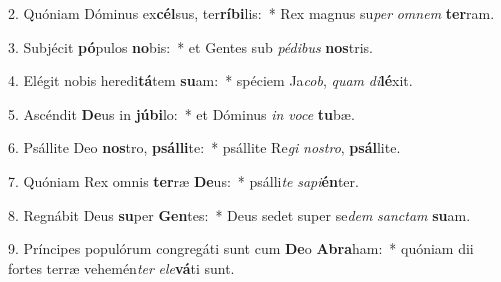 2. Quóniam Dóminus ex\textbf{cél}sus, ter\textbf{rí}\textbf{bi}lis:~*  Rex magnus su\textit{per} \textit{om}\textit{nem} \textbf{ter}ram.\

3. Subjécit \textbf{pó}pulos \textbf{no}bis:~*  et Gentes sub \textit{pé}\textit{di}\textit{bus} \textbf{nos}tris.\

4. Elégit nobis heredi\textbf{tá}tem \textbf{su}am:~*  spéciem Ja\textit{cob}, \textit{quam} \textit{di}\textbf{lé}xit.\

5. Ascéndit \textbf{De}us in \textbf{jú}\textbf{bi}lo:~*  et Dóminus \textit{in} \textit{vo}\textit{ce} \textbf{tu}bæ.\

6. Psállite Deo \textbf{nos}tro, \textbf{psál}\textbf{li}te:~*  psállite Re\textit{gi} \textit{nos}\textit{tro}, \textbf{psál}lite.\

7. Quóniam Rex omnis \textbf{ter}ræ \textbf{De}us:~*  psálli\textit{te} \textit{sa}\textit{pi}\textbf{én}ter.\

8. Regnábit Deus \textbf{su}per \textbf{Gen}tes:~*  Deus sedet super se\textit{dem} \textit{sanc}\textit{tam} \textbf{su}am.\

9. Príncipes populórum congregáti sunt cum \textbf{De}o \textbf{A}\textbf{bra}ham:~*  quóniam dii fortes terræ vehemén\textit{ter} \textit{e}\textit{le}\textbf{vá}ti sunt.\

